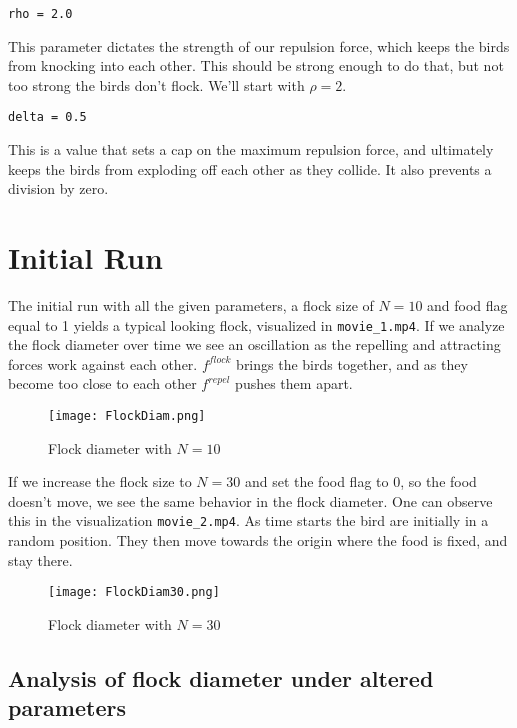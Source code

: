 \documentclass[12pt]{article}
\begin{document}
\begin{verbatim}
rho = 2.0
\end{verbatim}
This parameter dictates the strength of our repulsion force, which keeps the birds from knocking into each other. This should be strong enough to do that, but not too strong the birds don't flock. We'll start with $\rho = 2$.

\begin{verbatim}
delta = 0.5
\end{verbatim}
This is a value that sets a cap on the maximum repulsion force, and ultimately keeps the birds from exploding off each other as they collide. It also prevents a division by zero.

\section{Initial Run}
The initial run with all the given parameters, a flock size of $N = 10$ and food flag equal to 1 yields a typical looking flock, visualized in \texttt{movie\_1.mp4}. If we analyze the flock diameter over time we see an oscillation as the repelling and attracting forces work against each other. $f^{flock}$ brings the birds together, and as they become too close to each other $f^{repel}$ pushes them apart.

\begin{figure}[h]
    \begin{center}
        \texttt{[image: FlockDiam.png]}
        \caption{Flock diameter with $N = 10$}    
    \end{center}
\end{figure}

If we increase the flock size to $N = 30$ and set the food flag to 0, so the food doesn't move, we see
the same behavior in the flock diameter. One can observe this in the visualization \texttt{movie\_2.mp4}.
As time starts the bird are initially in a random position. They then move towards the origin where the food is fixed, and stay there.

\begin{figure}
    \centering
    \texttt{[image: FlockDiam30.png]}
    \caption{Flock diameter with $N = 30$}
\end{figure}
\subsection{Analysis of flock diameter under altered parameters}
\end{document}
